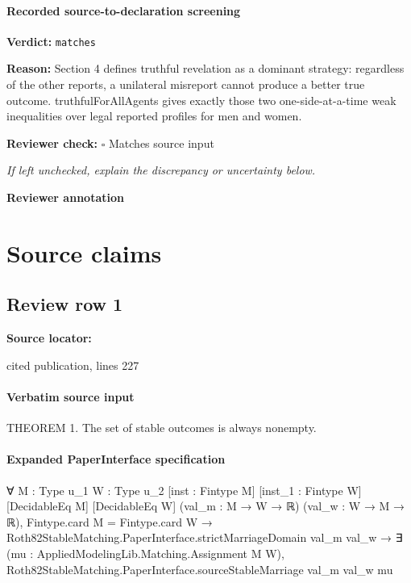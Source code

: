\documentclass[10pt]{article}
\newcommand{\reviewerbox}{%
  \par\noindent\fbox{\parbox{0.96\linewidth}{\rule{0pt}{0.38in}}}\par
}
\newcommand{\reviewmatch}[1]{%
  \par\noindent\textbf{Reviewer check:} $\square$\; #1\par
  \noindent\emph{If left unchecked, explain the discrepancy or uncertainty below.}\par
}
\begin{document}
\paragraph{Recorded source-to-declaration screening}
\textbf{Verdict:} \texttt{matches}
\\
{\raggedright
\textbf{Reason:} Section 4 defines truthful revelation as a dominant strategy:\allowbreak{} regardless of the other reports, a unilateral misreport cannot produce a better true outcome.\allowbreak{}  truthfulForAllAgents gives exactly those two one-\allowbreak{}side-\allowbreak{}at-\allowbreak{}a-\allowbreak{}time weak inequalities over legal reported profiles for men and women.\allowbreak{}
\par}
\reviewmatch{Matches source input}
\noindent\textbf{Reviewer annotation}\par
\reviewerbox

\clearpage
\hypertarget{source-claim-28dc2b89f44923a5}{}
\hypertarget{source-section-f10b5f68e4acf3dc}{}
\section*{Source claims}
\subsection*{Review row 1}
\textbf{Source locator:} {\footnotesize\raggedright cited publication, lines 227\par}
\paragraph{Verbatim source input}
\begin{ReviewVerbatim}
THEOREM 1. The set of stable outcomes is always nonempty.
\end{ReviewVerbatim}



\paragraph{Expanded PaperInterface specification}
\begin{ReviewVerbatim}
∀ {M : Type u_1} {W : Type u_2} [inst : Fintype M] [inst_1 : Fintype W] [DecidableEq M] [DecidableEq W]
  (val_m : M → W → ℝ) (val_w : W → M → ℝ),
  Fintype.card M = Fintype.card W →
    Roth82StableMatching.PaperInterface.strictMarriageDomain val_m val_w →
      ∃ (mu : AppliedModelingLib.Matching.Assignment M W),
        Roth82StableMatching.PaperInterface.sourceStableMarriage val_m val_w mu
\end{ReviewVerbatim}
\end{document}
